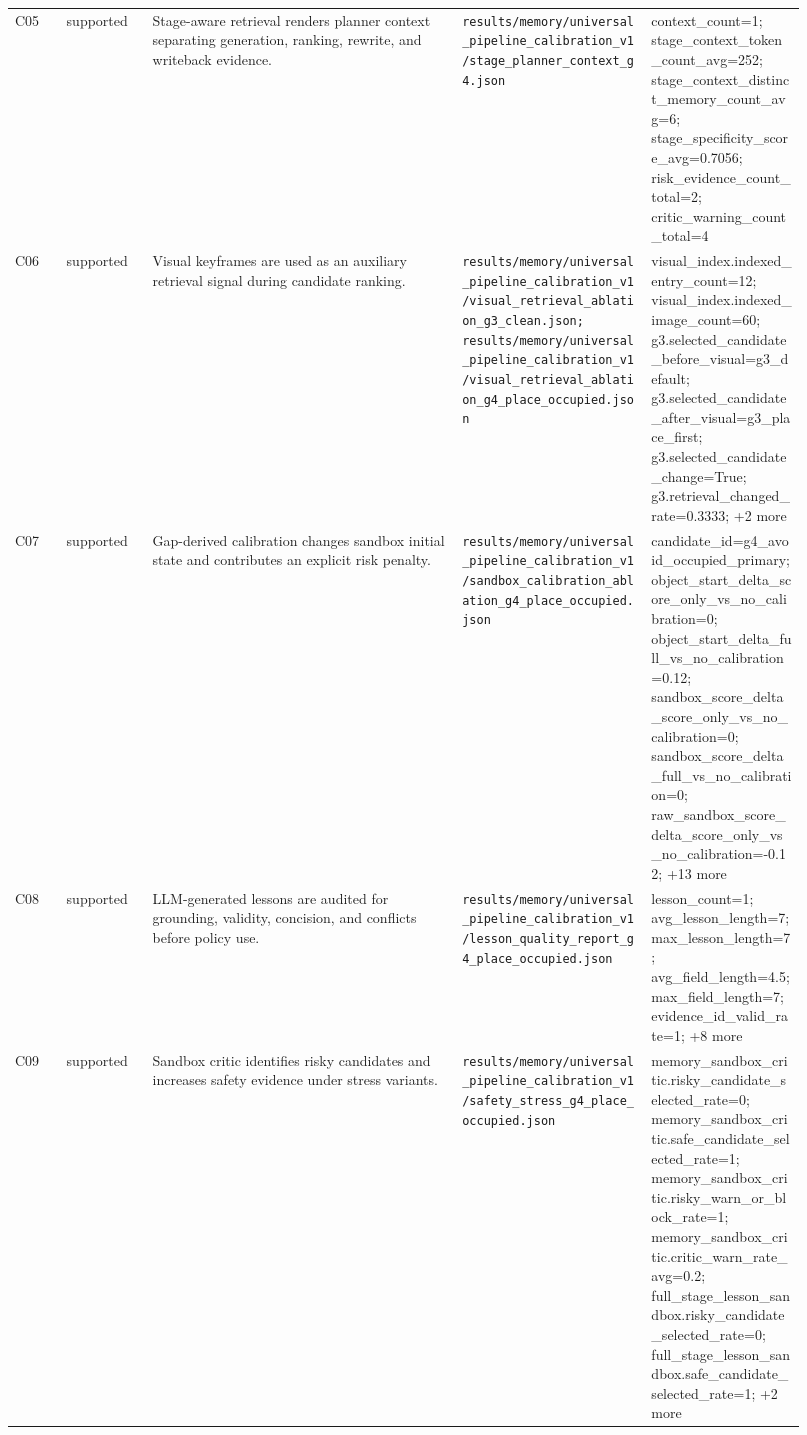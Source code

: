 \begin{table}[t]
\begin{tabular}{p{0.06\linewidth}p{0.10\linewidth}p{0.36\linewidth}p{0.22\linewidth}p{0.18\linewidth}}
C05 & supported & Stage-aware retrieval renders planner context separating generation, ranking, rewrite, and writeback evidence. & \texttt{results/memory/universal\_pipeline\_calibration\_v1/stage\_planner\_context\_g4.json} & context\_count=1; stage\_context\_token\_count\_avg=252; stage\_context\_distinct\_memory\_count\_avg=6; stage\_specificity\_score\_avg=0.7056; risk\_evidence\_count\_total=2; critic\_warning\_count\_total=4 \\
C06 & supported & Visual keyframes are used as an auxiliary retrieval signal during candidate ranking. & \texttt{results/memory/universal\_pipeline\_calibration\_v1/visual\_retrieval\_ablation\_g3\_clean.json; results/memory/universal\_pipeline\_calibration\_v1/visual\_retrieval\_ablation\_g4\_place\_occupied.json} & visual\_index.indexed\_entry\_count=12; visual\_index.indexed\_image\_count=60; g3.selected\_candidate\_before\_visual=g3\_default; g3.selected\_candidate\_after\_visual=g3\_place\_first; g3.selected\_candidate\_change=True; g3.retrieval\_changed\_rate=0.3333; +2 more \\
C07 & supported & Gap-derived calibration changes sandbox initial state and contributes an explicit risk penalty. & \texttt{results/memory/universal\_pipeline\_calibration\_v1/sandbox\_calibration\_ablation\_g4\_place\_occupied.json} & candidate\_id=g4\_avoid\_occupied\_primary; object\_start\_delta\_score\_only\_vs\_no\_calibration=0; object\_start\_delta\_full\_vs\_no\_calibration=0.12; sandbox\_score\_delta\_score\_only\_vs\_no\_calibration=0; sandbox\_score\_delta\_full\_vs\_no\_calibration=0; raw\_sandbox\_score\_delta\_score\_only\_vs\_no\_calibration=-0.12; +13 more \\
C08 & supported & LLM-generated lessons are audited for grounding, validity, concision, and conflicts before policy use. & \texttt{results/memory/universal\_pipeline\_calibration\_v1/lesson\_quality\_report\_g4\_place\_occupied.json} & lesson\_count=1; avg\_lesson\_length=7; max\_lesson\_length=7; avg\_field\_length=4.5; max\_field\_length=7; evidence\_id\_valid\_rate=1; +8 more \\
C09 & supported & Sandbox critic identifies risky candidates and increases safety evidence under stress variants. & \texttt{results/memory/universal\_pipeline\_calibration\_v1/safety\_stress\_g4\_place\_occupied.json} & memory\_sandbox\_critic.risky\_candidate\_selected\_rate=0; memory\_sandbox\_critic.safe\_candidate\_selected\_rate=1; memory\_sandbox\_critic.risky\_warn\_or\_block\_rate=1; memory\_sandbox\_critic.critic\_warn\_rate\_avg=0.2; full\_stage\_lesson\_sandbox.risky\_candidate\_selected\_rate=0; full\_stage\_lesson\_sandbox.safe\_candidate\_selected\_rate=1; +2 more \\

\end{tabular}
\end{table}
